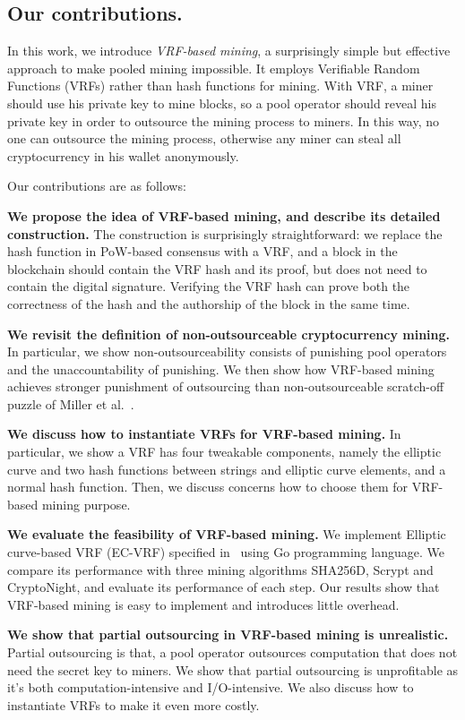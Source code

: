 \subsection{Our contributions.}
In this work, we introduce \textit{VRF-based mining}, a surprisingly simple but effective approach to make pooled mining impossible.
It employs Verifiable Random Functions (VRFs) rather than hash functions for mining.
With VRF, a miner should use his private key to mine blocks, so a pool operator should reveal his private key in order to outsource the mining process to miners.
In this way, no one can outsource the mining process, otherwise any miner can steal all cryptocurrency in his wallet anonymously.

Our contributions are as follows:

\textbf{We propose the idea of VRF-based mining, and describe its detailed construction.} The construction is surprisingly straightforward: we replace the hash function in PoW-based consensus with a VRF, and a block in the blockchain should contain the VRF hash and its proof, but does not need to contain the digital signature. Verifying the VRF hash can prove both the correctness of the hash and the authorship of the block in the same time.

\textbf{We revisit the definition of non-outsourceable cryptocurrency mining.} In particular, we show non-outsourceability consists of punishing pool operators and the unaccountability of punishing. We then show how VRF-based mining achieves stronger punishment of outsourcing than non-outsourceable scratch-off puzzle of Miller et al.~\cite{miller2015nonoutsourceable}.

\textbf{We discuss how to instantiate VRFs for VRF-based mining.} In particular, we show a VRF has four tweakable components, namely the elliptic curve and two hash functions between strings and elliptic curve elements, and a normal hash function. Then, we discuss concerns how to choose them for VRF-based mining purpose.

\textbf{We evaluate the feasibility of VRF-based mining.} We implement Elliptic curve-based VRF (EC-VRF) specified in~\cite{goldberg2017draft} using Go programming language. We compare its performance with three mining algorithms SHA256D, Scrypt and CryptoNight, and evaluate its performance of each step. Our results show that VRF-based mining is easy to implement and introduces little overhead.

\textbf{We show that partial outsourcing in VRF-based mining is unrealistic.} Partial outsourcing is that, a pool operator outsources computation that does not need the secret key to miners. We show that partial outsourcing is unprofitable as it's both computation-intensive and I/O-intensive. We also discuss how to instantiate VRFs to make it even more costly.


